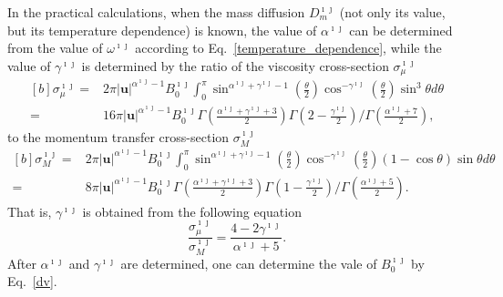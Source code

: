 In the practical calculations, when the mass diffusion $D^{\imath\jmath}_m$ (not only its value, but its temperature dependence) is known, the value of $\alpha^{\imath\jmath}$ can be determined  from the value of $\omega^{\imath\jmath}$ according to Eq.~\eqref{temperature_dependence}, while the value of $\gamma^{\imath\jmath}$ is determined by the ratio of the viscosity
cross-section $\sigma_\mu^{\imath\jmath}$
\begin{equation}\label{cross_section_v}
\begin{aligned}[b]
   {\sigma}_\mu^{\imath\jmath}=&2\pi|\textbf{u}|^{\alpha^{\imath\jmath}-1}B_0^{\imath\jmath}\int_0^\pi {}\sin^{\alpha^{\imath\jmath}+\gamma^{\imath\jmath}-1}
    \left(\frac{\theta}{2}\right)\cos^{-\gamma^{\imath\jmath}}\left(\frac{\theta}{2}\right)\sin^3\theta{d\theta}\\
    =&16\pi|\textbf{u}|^{\alpha^{\imath\jmath}-1}B_0^{\imath\jmath}\Gamma\left(\frac{\alpha^{\imath\jmath}+\gamma^{\imath\jmath}+3}{2}\right)
      \Gamma\left(2-\frac{\gamma^{\imath\jmath}}{2}\right)/\Gamma\left(\frac{\alpha^{\imath\jmath}+7}{2}\right),
      \end{aligned}
\end{equation}
to the momentum transfer cross-section $\sigma_M^{\imath\jmath}$ 
\begin{equation}\label{cross_section_d}
\begin{aligned}[b]
   {\sigma}_M^{\imath\jmath}=&2\pi|\textbf{u}|^{\alpha^{\imath\jmath}-1}B_0^{\imath\jmath}\int_0^\pi {}\sin^{\alpha^{\imath\jmath}+\gamma^{\imath\jmath}-1}
    \left(\frac{\theta}{2}\right)\cos^{-\gamma^{\imath\jmath}}\left(\frac{\theta}{2}\right)(1-\cos\theta)\sin\theta{d\theta}\\
    =&8\pi|\textbf{u}|^{\alpha^{\imath\jmath}-1}B_0^{\imath\jmath}\Gamma\left(\frac{\alpha^{\imath\jmath}+\gamma^{\imath\jmath}+3}{2}\right)
\Gamma\left(1-\frac{\gamma^{\imath\jmath}}{2}\right)/\Gamma\left(\frac{\alpha^{\imath\jmath}+5}{2}\right).
\end{aligned}
\end{equation}
That is, $\gamma^{\imath\jmath}$ is obtained from the following equation
\begin{equation}
\frac{\sigma_{\mu}^{\imath\jmath}}{\sigma_{M}^{\imath\jmath}}=\frac{4-2\gamma^{\imath\jmath}}{\alpha^{\imath\jmath}+5}.
\end{equation}
After $\alpha^{\imath\jmath}$ and $\gamma^{\imath\jmath}$ are determined, one can determine the vale of $B_0^{\imath\jmath}$ by Eq.~\eqref{dv}. 

